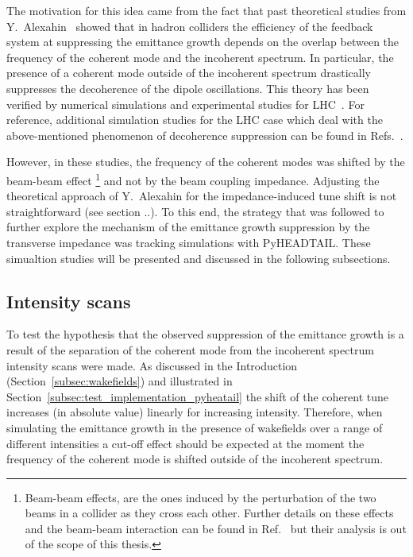 The motivation for this idea came from the fact that past theoretical studies from Y.~Alexahin~\cite{Alexahin:314169} showed that in hadron colliders the efficiency of the feedback system at suppressing the emittance growth depends on the overlap between the frequency of the coherent mode and the incoherent spectrum. In particular, the presence of a coherent mode outside of the incoherent spectrum drastically suppresses the decoherence of the dipole oscillations. This theory has been verified by numerical simulations and experimental studies for LHC~\cite{QIANG201853, PhysRevAccelBeams.23.021002, PhysRevAccelBeams.24.011003}. %
For reference, additional simulation studies for the LHC case which deal with the above-mentioned phenomenon of decoherence suppression can be found in Refs.~\cite{Alexahin:497415, Herr:486007}. 

However, in these studies, the frequency of the coherent modes was shifted by the beam-beam effect \footnote{Beam-beam effects, are the ones induced by the perturbation of the two beams in a collider as they cross each other. Further details on these effects and the beam-beam interaction can be found in Ref.~\cite{Herr:1982430} but their analysis is out of the scope of this thesis.} and not by the beam coupling impedance. Adjusting the theoretical approach of Y.~Alexahin for the impedance-induced tune shift is not straightforward (see section ..). To this end, the strategy that was followed to further explore the mechanism of the emittance growth suppression by the transverse impedance was tracking simulations with PyHEADTAIL. These simualtion studies will be presented and discussed in the following subsections.


\subsection{Intensity scans}\label{subsec:intensity_scan_emit_growth}
To test the hypothesis that the observed suppression of the emittance growth is a result of the separation of the coherent mode from the incoherent spectrum intensity scans were made. As discussed in the Introduction (Section~\ref{subsec:wakefields}) and illustrated in Section~\ref{subsec:test_implementation_pyheatail} the shift of the coherent tune increases (in absolute value) linearly for increasing intensity. Therefore, when simulating the emittance growth in the presence of wakefields over a range of different intensities a cut-off effect should be expected at the moment the frequency of the coherent mode is shifted outside of the incoherent spectrum.

